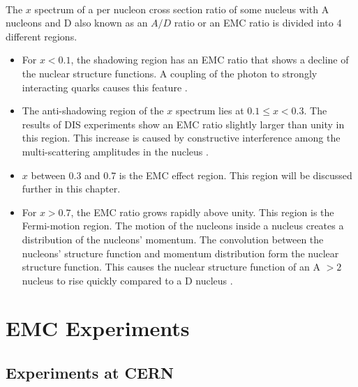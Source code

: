 \paragraph{}The $x$ spectrum of a per nucleon cross section ratio of some nucleus with A nucleons and D also known as an $A/D$ ratio or an EMC ratio is divided into 4 different regions. 
\begin{itemize}
	\item For $x < 0.1$, the shadowing region has an EMC ratio that shows a decline of the nuclear structure functions. A coupling of the photon to strongly interacting quarks causes this feature \cite{PnN}.
	\item The anti-shadowing region of the $x$ spectrum lies at $0.1 \leq x < 0.3 $. The results of DIS experiments show an EMC ratio slightly larger than unity in this region. This increase is caused by constructive interference among the multi-scattering amplitudes in the nucleus \cite{shadowing}.
	\item $x$ between 0.3 and 0.7 is the EMC effect region. This region will be discussed further in this chapter.
	\item For $x > 0.7$, the EMC ratio grows rapidly above unity.  This region is the Fermi-motion region. The  motion of the nucleons inside a nucleus creates a distribution of the nucleons'  momentum. The convolution between the nucleons' structure function and momentum distribution form the nuclear structure function. This causes the nuclear structure function of an A $> 2$ nucleus to rise quickly compared to a D nucleus \cite{Ajth,PnN}. 
\end{itemize}
\section{EMC Experiments}
\subsection{Experiments at CERN}
